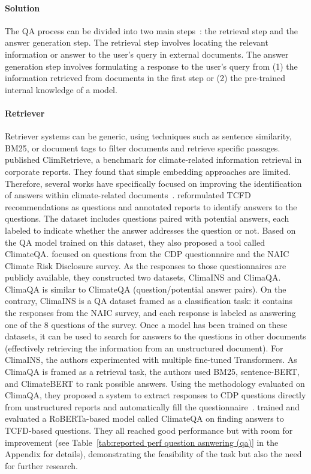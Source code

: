 \paragraph{Solution} The QA process can be divided into two main steps~\cite{krausEnhancingLargeLanguage2023}: the retrieval step and the answer generation step. The retrieval step involves locating the relevant information or answer to the user's query in external documents. The answer generation step involves formulating a response to the user's query from (1) the information retrieved from documents in the first step or (2) the pre-trained internal knowledge of a model. 

\paragraph{Retriever} Retriever systems can be generic, using techniques such as sentence similarity, BM25, or document tags to filter documents and retrieve specific passages. \citet{schimanski-etal-2024-climretrieve} published ClimRetrieve, a benchmark for climate-related information retrieval in corporate reports. They found that simple embedding approaches are limited.
Therefore, several works have specifically focused on improving the identification of answers within climate-related documents~\cite{luccioni_analyzing_2020, spokoyny2023answering}. \citet{luccioni_analyzing_2020} reformulated TCFD recommendations as questions and annotated reports to identify answers to the questions. The dataset includes questions paired with potential answers, each labeled to indicate whether the answer addresses the question or not. Based on the QA model trained on this dataset, they also proposed a tool called ClimateQA. \citet{spokoyny2023answering} focused on questions from the CDP questionnaire and the NAIC Climate Risk Disclosure survey. As the responses to those questionnaires are publicly available, they constructed two datasets, ClimaINS and ClimaQA. ClimaQA is similar to ClimateQA (question/potential answer pairs). On the contrary, ClimaINS is a QA dataset framed as a classification task: it contains the responses from the NAIC survey, and each response is labeled as answering one of the 8 questions of the survey.  Once a model has been trained on these datasets, it can be used to search for answers to the questions in other documents (effectively retrieving the information from an unstructured document). 
For ClimaINS, the authors experimented with multiple fine-tuned Transformers. As ClimaQA is framed as a retrieval task, the authors used BM25, sentence-BERT, and ClimateBERT to rank possible answers. Using the methodology evaluated on ClimaQA, they proposed a system to extract responses to CDP questions directly from unstructured reports and automatically fill the questionnaire~\cite{spokoyny2023answering}. \citet{luccioni_analyzing_2020} trained and evaluated a RoBERTa-based model called ClimateQA on finding answers to TCFD-based questions. They all reached good performance but with room for improvement (see Table~\ref{tab:reported perf question asnwering (qa)} in the Appendix for details), demonstrating the feasibility of the task but also the need for further research.

